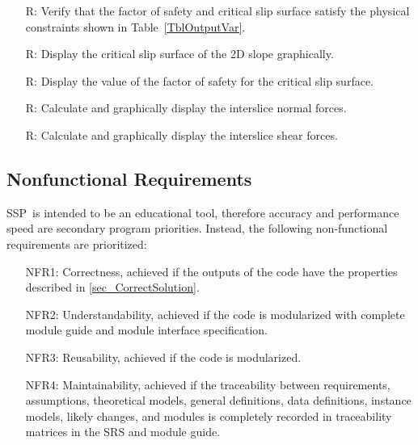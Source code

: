 \documentclass[12pt]{article}
\newcommand{\progname}{SSP}
\newcounter{reqnum} %
\begin{document}
\begin{itemize}

\item[R\refstepcounter{reqnum}\thereqnum \label{R_VerifyOutput}:] Verify that 
the factor of safety and critical slip surface satisfy the physical constraints 
shown in Table~\ref{TblOutputVar}.

\item[R\refstepcounter{reqnum}\thereqnum \label{R_CritGraph}:] Display
  the critical slip surface of the 2D slope graphically. 
  
\item[R\refstepcounter{reqnum}\thereqnum \label{R_OutputFS}:] Display the value 
of the factor of safety for the critical slip surface.

\item[R\refstepcounter{reqnum}\thereqnum \label{R_NormalGraph}:] Calculate and 
graphically display the interslice normal forces.

\item[R\refstepcounter{reqnum}\thereqnum \label{R_ShearGraph}:] Calculate and 
graphically display the interslice shear forces.
  
\end{itemize}


\subsection{Nonfunctional Requirements}

\progname\ is intended to be an educational tool, therefore accuracy and
performance speed are secondary program priorities. Instead, the following 
non-functional requirements are prioritized:

\begin{itemize}
\item[NFR1:] Correctness, achieved if the outputs of the code have the 
properties described 
in \ref{sec_CorrectSolution}.
\item[NFR2:] Understandability, achieved if the code is modularized with 
complete module guide and module interface specification.
\item[NFR3:] Reusability, achieved if the code is modularized.
\item[NFR4:] Maintainability, achieved if the traceability between 
requirements, assumptions, theoretical models, general definitions, data 
definitions, instance models, likely changes, and modules is completely 
recorded in traceability matrices in the SRS and module guide.
\end{itemize}
\end{document}
